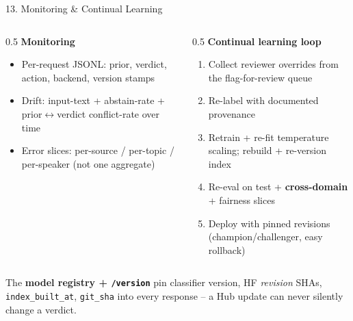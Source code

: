 \documentclass[10pt,aspectratio=169]{beamer}
\begin{document}
\begin{frame}{13. Monitoring \& Continual Learning}
\begin{columns}[T]
\begin{column}{0.5\textwidth}
\textbf{Monitoring}
\begin{itemize}\small
  \item Per-request JSONL: prior, verdict, action, backend, version stamps
  \item Drift: input-text + abstain-rate + prior$\leftrightarrow$verdict conflict-rate over time
  \item Error slices: per-source / per-topic / per-speaker (not one aggregate)
\end{itemize}
\end{column}
\begin{column}{0.5\textwidth}
\textbf{Continual learning loop}
\begin{enumerate}\small
  \item Collect reviewer overrides from the flag-for-review queue
  \item Re-label with documented provenance
  \item Retrain + re-fit temperature scaling; rebuild + re-version index
  \item Re-eval on test + \textbf{cross-domain} + fairness slices
  \item Deploy with pinned revisions (champion/challenger, easy rollback)
\end{enumerate}
\end{column}
\end{columns}

\vspace{0.2cm}
\centering
\small The \textbf{model registry + \texttt{/version}} pin classifier version, HF \emph{revision} SHAs, \texttt{index\_built\_at}, \texttt{git\_sha} into every response -- a Hub update can never silently change a verdict.
\end{frame}
\end{document}
